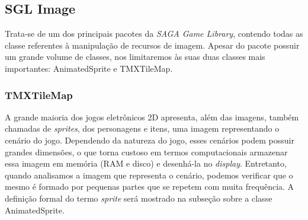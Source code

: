 \subsection{SGL Image}
%
Trata-se de um dos principais pacotes da \textit{SAGA Game Library}, contendo todas as classe referentes à manipulação de recursos de imagem. Apesar do pacote possuir um grande volume de classes, nos limitaremos às suas duas classes mais importantes: AnimatedSprite e TMXTileMap.
%
%
%
\subsubsection{TMXTileMap}
%
%
%
A grande maioria dos jogos eletrônicos 2D apresenta, além das imagens, também chamadas de \textit{sprites}, dos personagens e itens, uma imagem representando o cenário do jogo. Dependendo da natureza do jogo, esses cenários podem possuir grandes dimensões, o que torna custoso em termos computacionais armazenar essa imagem em memória (RAM e disco) e desenhá-la no \textit{display}. Entretanto, quando analisamos a imagem que representa o cenário, podemos verificar que o mesmo é formado por pequenas partes que se repetem com muita frequência. A definição formal do termo \textit{sprite} será mostrado na subseção sobre a classe AnimatedSprite.

